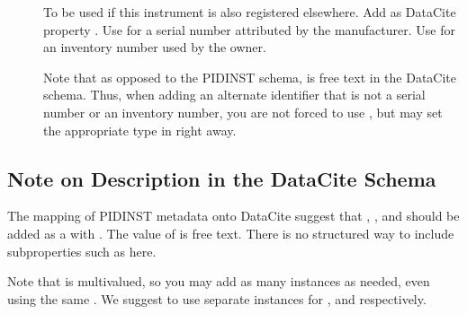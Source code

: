 \documentclass[a4paper,10pt,english]{sphinxmanual}
\begin{document}
\begin{description}
\item[{}] \leavevmode
\sphinxAtStartPar
To be used if this instrument is also registered elsewhere.  Add as
DataCite property .  Use
 for a serial number
attributed by the manufacturer.  Use
 for an inventory number
used by the owner.

\sphinxAtStartPar
Note that as opposed to the PIDINST schema,
 is free text in the DataCite schema.
Thus, when adding an alternate identifier that is not a serial
number or an inventory number, you are not forced to use
, but may set the appropriate type in
 right away.

\end{description}


\subsection{Note on Description in the DataCite Schema}
\label{\detokenize{datacite-cookbook/metadata:note-on-description-in-the-datacite-schema}}
\sphinxAtStartPar
The mapping of PIDINST metadata onto DataCite suggest that ,
, and  should be added as a
 with .  The value of
 is free text.  There is no structured way to include
subproperties such as  here.

\sphinxAtStartPar
Note that  is multivalued, so you may add as many
instances as needed, even using the same .  We
suggest to use separate  instances for ,
 and  respectively.
\end{document}
